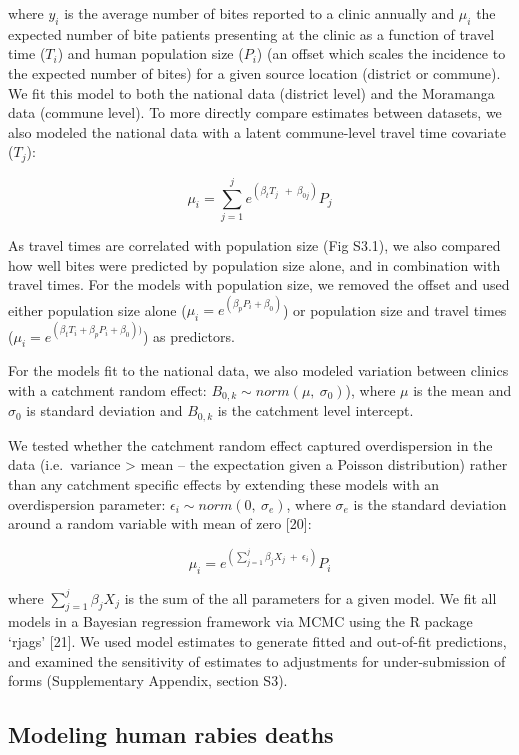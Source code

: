 \documentclass[
]{book}
\begin{document}
where \(y_{i}\) is the average number of bites reported to a clinic
annually and \(\mu_{i}\) the expected number of bite patients presenting
at the clinic as a function of travel time (\(T_{i}\)) and human
population size (\(P_{i}\)) (an offset which scales the incidence to the
expected number of bites) for a given source location (district or
commune). We fit this model to both the national data (district level)
and the Moramanga data (commune level). To more directly compare
estimates between datasets, we also modeled the national data with a
latent commune-level travel time covariate (\(T_{j}\)):

\[\mu_{i} = \sum_{j = 1}^{j}e^{(\beta_{t}T_{j}\ \  + \ \beta_{0j})}P_{j}\]

As travel times are correlated with population size (Fig S3.1), we also
compared how well bites were predicted by population size alone, and in
combination with travel times. For the models with population size, we
removed the offset and used either population size alone
(\(\mu_{i} = e^{(\beta_{p}P_{i} + \beta_{0})}\)) or population size and
travel times
(\(\mu_{i} = e^{(\beta_{t}T_{i} + \beta_{p}P_{i} + \beta_{0}))}\)) as
predictors.

For the models fit to the national data, we also modeled variation
between clinics with a catchment random effect:
\(B_{0,k} \sim norm(\mu,\ \sigma_{0})\)), where \(\mu\) is the mean and
\(\sigma_{0}\) is standard deviation and \(B_{0,k}\) is the catchment level
intercept.

We tested whether the catchment random effect captured overdispersion in
the data (i.e.~variance \textgreater{} mean -- the expectation given a Poisson
distribution) rather than any catchment specific effects by extending
these models with an overdispersion parameter:
\(\epsilon_{i} \sim norm(0,\ \sigma_{e})\), where \(\sigma_{e}\) is the
standard deviation around a random variable with mean of zero {[}20{]}:

\[\mu_{i} = e^{(\sum_{j = 1}^{j}\beta_{j}X_{j}\  + \ \epsilon_{i})}P_{i}\]

where \(\sum_{j = 1}^{j}\beta_{j}X_{j}\) is the sum of the all parameters
for a given model. We fit all models in a Bayesian regression framework
via MCMC using the R package `rjags' {[}21{]}. We used model estimates to
generate fitted and out-of-fit predictions, and examined the sensitivity
of estimates to adjustments for under-submission of forms (Supplementary
Appendix, section S3).

\hypertarget{modeling-human-rabies-deaths}{%
\subsection{Modeling human rabies deaths}\label{modeling-human-rabies-deaths}}
\end{document}
